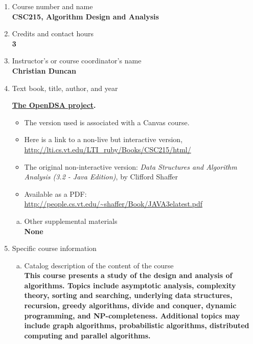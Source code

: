 \label{CSC215}  %
\begin{enumerate}[1.]
\item Course number and name\\
  {\bfseries
    CSC215, Algorithm Design and Analysis   
  }
  
\item Credits and contact hours\\
  {\bfseries
    3    
  }

\item Instructor's or course coordinator's name\\
  {\bfseries
    Christian Duncan    
  }

\item Text book, title, author, and year\\
  {\bfseries
    \href{https://opendsa-server.cs.vt.edu/}{The OpenDSA project}.
    \begin{itemize}
    \item The version used is associated with a Canvas course.
    \item Here is a link to a non-live but interactive version, \url{http://lti.cs.vt.edu/LTI_ruby/Books/CSC215/html/}
    \item The original non-interactive version: {\em Data Structures and Algorithm Analysis (3.2 - Java Edition)}, by Clifford Shaffer
    \item Available as a PDF: \url{http://people.cs.vt.edu/~shaffer/Book/JAVA3elatest.pdf}
    \end{itemize}
  }
\begin{enumerate}[a.]
\item Other supplemental materials\\
  {\bfseries
    None    
  }
\end{enumerate}

\item Specific course information
\begin{enumerate}[a.]  
\item Catalog description of the content of the course\\
  {\bfseries
    This course presents a study of the design and analysis of algorithms. Topics include asymptotic analysis, complexity theory, sorting and searching, underlying data structures, recursion, greedy algorithms, divide and conquer, dynamic programming, and NP-completeness. Additional topics may include graph algorithms, probabilistic algorithms, distributed computing and parallel algorithms.
  }


\end{enumerate}
\end{enumerate}

